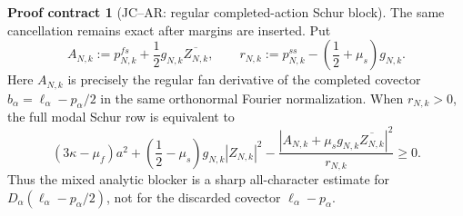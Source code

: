 \documentclass[11pt]{amsart}
\numberwithin{equation}{section}
\theoremstyle{definition}
\newtheorem{contract}[theorem]{Proof contract}
\theoremstyle{remark}
\begin{document}
\begin{contract}[JC--AR: regular completed-action Schur block]
The same cancellation remains exact after margins are inserted.  Put
\[
 A_{N,k}:=p^{fs}_{N,k}
 +\frac12g_{N,k}\overline{Z_{N,k}},
 \qquad
 r_{N,k}:=p^{ss}_{N,k}
 -\left(\frac12+\mu_s\right)g_{N,k}.
\]
Here $A_{N,k}$ is precisely the regular fan derivative of the completed
covector $b_\alpha=\ell_\alpha-p_\alpha/2$ in the same orthonormal
Fourier normalization.  When $r_{N,k}>0$, the full modal Schur row is
equivalent to
\begin{equation}\label{JC:eq:regular-action-reduced-Schur}
 \boxed{
 (3\kappa-\mu_f)a^2
 +\left(\frac12-\mu_s\right)g_{N,k}|Z_{N,k}|^2
 -\frac{|A_{N,k}+\mu_sg_{N,k}\overline{Z_{N,k}}|^2}
 {r_{N,k}}\ge0.}
\end{equation}
Thus the mixed analytic blocker is a sharp all-character estimate for
$D_\alpha(\ell_\alpha-p_\alpha/2)$, not for the discarded covector
$\ell_\alpha-p_\alpha$.


\end{contract}
\end{document}
